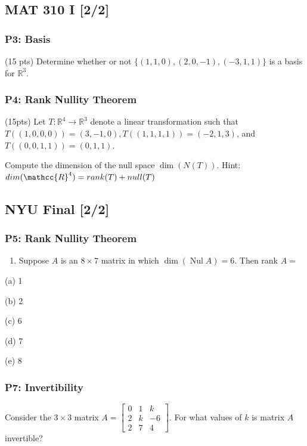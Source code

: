 \documentclass[11pt]{article}
\begin{document}
\subsection{MAT 310 I [2/2]}
\label{sec:org6ac13f1}
\subsubsection{P3: Basis}
\label{sec:org5420bd4}
(15 pts) Determine whether or not \(\{(1,1,0),(2,0,-1),(-3,1,1)\}\) is a basis
for \(\mathbb{R}^{3}\).
\subsubsection{P4: Rank Nullity Theorem}
\label{sec:org3b979bc}
(15pts) Let \(T: \mathbb{R}^{4} \rightarrow \mathbb{R}^{3}\) denote a linear
transformation such that \(T((1,0,0,0))= (3,-1,0), T((1,1,1,1))=(-2,1,3)\), and
\(T((0,0,1,1))=(0,1,1)\).

Compute the dimension of the null space
\(\operatorname{dim}(N(T))\). Hint:\(dim(\mathcc{R}^{4}) = rank(T) + null(T)\)
\subsection{NYU Final [2/2]}
\label{sec:orgc3b33e5}
\subsubsection{P5: Rank Nullity Theorem}
\label{sec:orgf7696e1}
\begin{enumerate}
\item Suppose \(A\) is an \(8 \times 7\) matrix in which \(\operatorname{dim}(\operatorname{Nul} A)=6\). Then rank \(A=\)
\end{enumerate}

(a) 1

(b) 2

(c) 6

(d) 7

(e) 8
\subsubsection{P7: Invertibility}
\label{sec:org711d96b}
Consider the \(3 \times 3\) matrix \(A=\left[\begin{array}{rrr}0 & 1 & k \\ 2 & k
 & -6 \\ 2 & 7 & 4\end{array}\right]\). For what values of \(k\) is matrix \(A\)
invertible?
\end{document}
